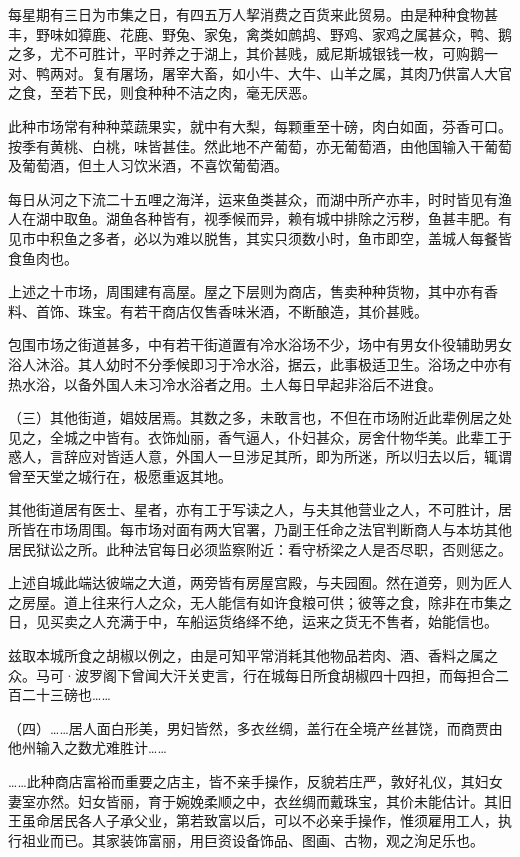 \documentclass[12pt,UTF8]{ctexbook}
\begin{document}
每星期有三日为市集之日，有四五万人挈消费之百货来此贸易。由是种种食物甚丰，野味如獐鹿、花鹿、野兔、家兔，禽类如鹧鸪、野鸡、家鸡之属甚众，鸭、鹅之多，尤不可胜计，平时养之于湖上，其价甚贱，威尼斯城银钱一枚，可购鹅一对、鸭两对。复有屠场，屠宰大畜，如小牛、大牛、山羊之属，其肉乃供富人大官之食，至若下民，则食种种不洁之肉，毫无厌恶。

此种市场常有种种菜蔬果实，就中有大梨，每颗重至十磅，肉白如面，芬香可口。按季有黄桃、白桃，味皆甚佳。然此地不产葡萄，亦无葡萄酒，由他国输入干葡萄及葡萄酒，但土人习饮米酒，不喜饮葡萄酒。

每日从河之下流二十五哩之海洋，运来鱼类甚众，而湖中所产亦丰，时时皆见有渔人在湖中取鱼。湖鱼各种皆有，视季候而异，赖有城中排除之污秽，鱼甚丰肥。有见市中积鱼之多者，必以为难以脱售，其实只须数小时，鱼市即空，盖城人每餐皆食鱼肉也。

上述之十市场，周围建有高屋。屋之下层则为商店，售卖种种货物，其中亦有香料、首饰、珠宝。有若干商店仅售香味米酒，不断酿造，其价甚贱。

包围市场之街道甚多，中有若干街道置有冷水浴场不少，场中有男女仆役辅助男女浴人沐浴。其人幼时不分季候即习于冷水浴，据云，此事极适卫生。浴场之中亦有热水浴，以备外国人未习冷水浴者之用。土人每日早起非浴后不进食。

（三）其他街道，娼妓居焉。其数之多，未敢言也，不但在市场附近此辈例居之处见之，全城之中皆有。衣饰灿丽，香气逼人，仆妇甚众，房舍什物华美。此辈工于惑人，言辞应对皆适人意，外国人一旦涉足其所，即为所迷，所以归去以后，辄谓曾至天堂之城行在，极愿重返其地。

其他街道居有医士、星者，亦有工于写读之人，与夫其他营业之人，不可胜计，居所皆在市场周围。每市场对面有两大官署，乃副王任命之法官判断商人与本坊其他居民狱讼之所。此种法官每日必须监察附近：看守桥梁之人是否尽职，否则惩之。

上述自城此端达彼端之大道，两旁皆有房屋宫殿，与夫园囿。然在道旁，则为匠人之房屋。道上往来行人之众，无人能信有如许食粮可供；彼等之食，除非在市集之日，见买卖之人充满于中，车船运货络绎不绝，运来之货无不售者，始能信也。

兹取本城所食之胡椒以例之，由是可知平常消耗其他物品若肉、酒、香料之属之众。马可·波罗阁下曾闻大汗关吏言，行在城每日所食胡椒四十四担，而每担合二百二十三磅也……

（四）……居人面白形美，男妇皆然，多衣丝绸，盖行在全境产丝甚饶，而商贾由他州输入之数尤难胜计……

……此种商店富裕而重要之店主，皆不亲手操作，反貌若庄严，敦好礼仪，其妇女妻室亦然。妇女皆丽，育于婉娩柔顺之中，衣丝绸而戴珠宝，其价未能估计。其旧王虽命居民各人子承父业，第若致富以后，可以不必亲手操作，惟须雇用工人，执行祖业而已。其家装饰富丽，用巨资设备饰品、图画、古物，观之洵足乐也。
\end{document}
